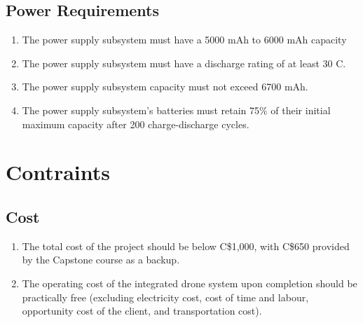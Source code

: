 \documentclass[10pt,letterpaper]{article}
\begin{document}
\subsection{Power Requirements}
\begin{enumerate}[label=NF.PR.\arabic*, wide=1cm, widest=3cm, leftmargin=*, font=\bfseries, noitemsep,topsep=0pt, parsep=4pt, partopsep=0pt]
	\item The power supply subsystem must have a 5000 mAh to 6000 mAh capacity 
	\item The power supply subsystem must have a discharge rating of at least 30 C.
	\item The power supply subsystem capacity must not exceed 6700 mAh.
	\item The power supply subsystem's batteries must retain 75\% of their initial maximum capacity after 200 charge-discharge cycles.
\end{enumerate}

\section{Contraints}


\subsection{Cost}
\begin{enumerate}[label=C.CT.\arabic*, wide=1cm, widest=3cm, leftmargin=*, font=\bfseries, noitemsep,topsep=0pt, parsep=4pt, partopsep=0pt]
    \item The total cost of the project should be below C\$1,000, with C\$650 provided by the Capstone course as a backup.
    \item The operating cost of the integrated drone system upon completion should be practically free (excluding electricity cost, cost of time and labour, opportunity cost of the client, and transportation cost).
\end{enumerate}
\end{document}
